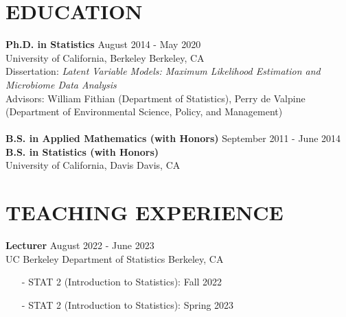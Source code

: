 \documentclass{res}
\begin{document}
\newcommand*\leftright[2]{%
\leavevmode
  {#1}%
  \hfill%
  #2}
\newcommand*\leftrighta[2]{%
  \leavevmode
  \rlap{#1}%
  \hspace{0.5\linewidth}%
  #2}


\address{Phone: (510) 676-8616 | Email: jcyhong@berkeley.edu | Website: http://jcyhong.github.io}
                                  
\begin{resume}  
 
\section{EDUCATION}
    \leftright{\textbf{Ph.D. in Statistics}}{August 2014 - May 2020} \\ 
    \leftright{University of California, Berkeley}{Berkeley, CA}\\
    Dissertation: \textit{Latent Variable Models: Maximum Likelihood Estimation and Microbiome Data Analysis}\\
    Advisors: William Fithian (Department of Statistics), Perry de Valpine (Department of Environmental Science, Policy, and Management)
    \\
    \\
    \leftright{\textbf{B.S. in Applied Mathematics (with Honors)}}{September 2011 - June 2014} \\
    \textbf{B.S. in Statistics (with Honors)} \\
    \leftright{University of California, Davis}{Davis, CA} \\

\section{TEACHING EXPERIENCE}

     \leftright{{\bf Lecturer}}{August 2022 - June 2023} \\ 
    \leftright{UC Berkeley Department of Statistics}{{Berkeley, CA}} 
        \begin{itemize}\setlength\itemsep{0em}
        \item[-] STAT 2 (Introduction to Statistics): Fall 2022
        \item[-] STAT 2 (Introduction to Statistics): Spring 2023
        \end{itemize}
        

\end{resume}
\end{document}

